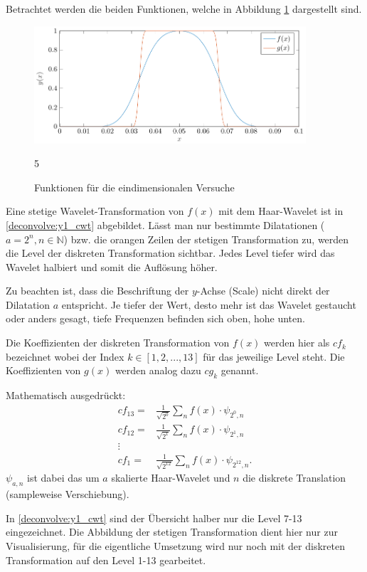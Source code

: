 Betrachtet werden die beiden Funktionen, welche in Abbildung \ref{deconvolve:1d} dargestellt sind.
\begin{figure}[h]
\centering
\includegraphics[width=0.9\textwidth]{./papers/deconvolve/pictures/1d.pdf}
\caption{Funktionen für die eindimensionalen Versuche\label{deconvolve:1d}}5
\end{figure}
Eine stetige Wavelet-Transformation von $f(x)$ mit dem Haar-Wavelet ist in \ref{deconvolve:y1_cwt} abgebildet.
Lässt man nur bestimmte Dilatationen ($a=2^n, n\in \mathbb{N}$) bzw. die orangen \glqq Zeilen\grqq{} der stetigen Transformation zu, werden die Level der diskreten Transformation sichtbar.
Jedes Level tiefer wird das Wavelet \glqq halbiert\grqq{} und somit die Auflösung höher.

Zu beachten ist, dass die Beschriftung der $y$-Achse (Scale) nicht direkt der Dilatation $a$ entspricht.
Je tiefer der Wert, desto mehr ist das Wavelet gestaucht oder anders gesagt, tiefe Frequenzen befinden sich oben, hohe unten.


Die Koeffizienten der diskreten Transformation von $f(x)$ werden hier als $cf_k$ bezeichnet wobei der Index $k\in[1,2,...,13]$ für das jeweilige Level steht.
Die Koeffizienten von $g(x)$ werden analog dazu $cg_k$ genannt.

Mathematisch ausgedrückt:
\begin{align*}
	cf_{13} =& \frac{1}{\sqrt{2^0}}\sum_{n}f(x)\cdot\psi_{2^0, n}\\
	cf_{12} =& \frac{1}{\sqrt{2^1}}\sum_{n}f(x)\cdot\psi_{2^1, n}\\
	\vdots\\
	cf_{1} =& \frac{1}{\sqrt{2^{12}}}\sum_{n}f(x)\cdot\psi_{2^{12}, n}.
\end{align*}
$\psi_{a,n}$ ist dabei das  um $a$ skalierte Haar-Wavelet und $n$ die diskrete Translation (sampleweise Verschiebung).

In \ref{deconvolve:y1_cwt} sind der Übersicht halber nur die Level 7-13 eingezeichnet. 
Die Abbildung der stetigen Transformation dient hier nur zur Visualisierung, für die eigentliche Umsetzung wird nur noch mit der diskreten Transformation auf den Level 1-13 gearbeitet.


